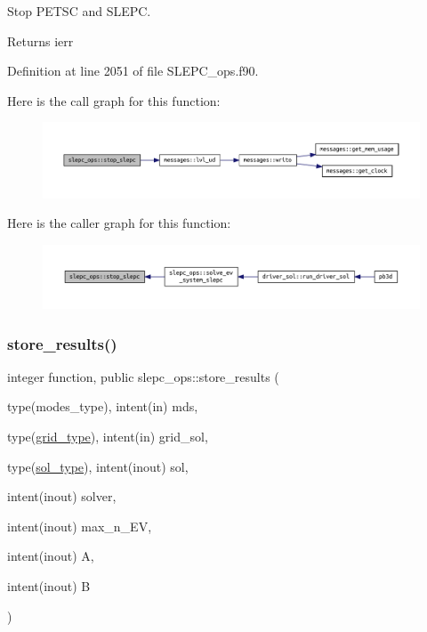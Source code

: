 Stop P\+E\+T\+SC and S\+L\+E\+PC. 

\begin{DoxyReturn}{Returns}
ierr 
\end{DoxyReturn}


Definition at line 2051 of file S\+L\+E\+P\+C\+\_\+ops.\+f90.

Here is the call graph for this function\+:\nopagebreak
\begin{figure}[H]
\begin{center}
\leavevmode
\includegraphics[width=350pt]{namespaceslepc__ops_aeeac6908b3988f395314e7769829a058_cgraph}
\end{center}
\end{figure}
Here is the caller graph for this function\+:\nopagebreak
\begin{figure}[H]
\begin{center}
\leavevmode
\includegraphics[width=350pt]{namespaceslepc__ops_aeeac6908b3988f395314e7769829a058_icgraph}
\end{center}
\end{figure}
\mbox{\label{namespaceslepc__ops_a24d97496000ed55f1d11e4d436e084a6}} 
\subsubsection{\texorpdfstring{store\+\_\+results()}{store\_results()}}
{\footnotesize\ttfamily integer function, public slepc\+\_\+ops\+::store\+\_\+results (\begin{DoxyParamCaption}\item[{type(modes\+\_\+type), intent(in)}]{mds,  }\item[{type(\hyperlink{structgrid__vars_1_1grid__type}{grid\+\_\+type}), intent(in)}]{grid\+\_\+sol,  }\item[{type(\hyperlink{structsol__vars_1_1sol__type}{sol\+\_\+type}), intent(inout)}]{sol,  }\item[{intent(inout)}]{solver,  }\item[{intent(inout)}]{max\+\_\+n\+\_\+\+EV,  }\item[{intent(inout)}]{A,  }\item[{intent(inout)}]{B }\end{DoxyParamCaption})}



